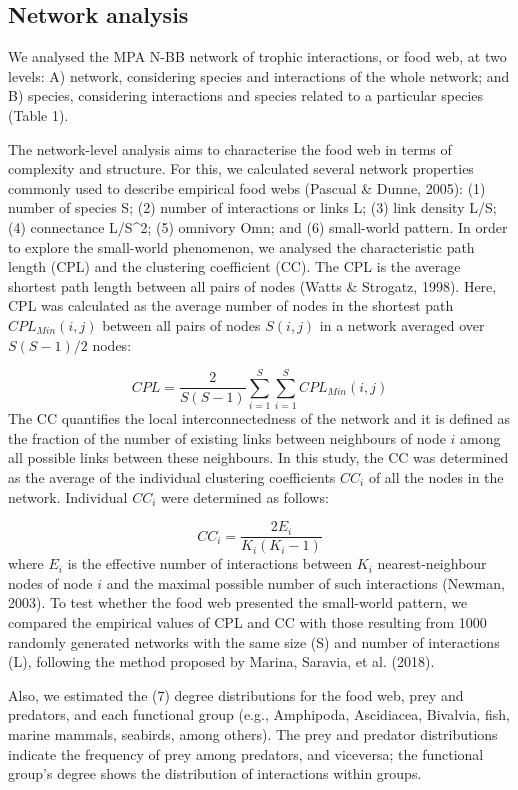 \documentclass[preprint, 3p,
authoryear]{elsarticle} %
\begin{document}
\hypertarget{network-analysis}{%
\subsection{Network analysis}\label{network-analysis}}

We analysed the MPA N-BB network of trophic interactions, or food web,
at two levels: A) network, considering species and interactions of the
whole network; and B) species, considering interactions and species
related to a particular species (Table 1).

The network-level analysis aims to characterise the food web in terms of
complexity and structure. For this, we calculated several network
properties commonly used to describe empirical food webs (Pascual \&
Dunne, 2005): (1) number of species S; (2) number of interactions or
links L; (3) link density L/S; (4) connectance L/S\^{}2; (5) omnivory
Omn; and (6) small-world pattern. In order to explore the small-world
phenomenon, we analysed the characteristic path length (CPL) and the
clustering coefficient (CC). The CPL is the average shortest path length
between all pairs of nodes (Watts \& Strogatz, 1998). Here, CPL was
calculated as the average number of nodes in the shortest path
\(CPL_{Min} (i,j)\) between all pairs of nodes \(S(i,j)\) in a network
averaged over \(S(S-1)/2\) nodes:

\[
CPL = \frac{2}{S(S-1)} \sum_{i = 1}^{S} \sum_{i = 1}^{S} {CPL_{Min}(i,j)}
\] The CC quantifies the local interconnectedness of the network and it
is defined as the fraction of the number of existing links between
neighbours of node \(i\) among all possible links between these
neighbours. In this study, the CC was determined as the average of the
individual clustering coefficients \(CC_i\) of all the nodes in the
network. Individual \(CC_i\) were determined as follows:

\[
CC_i = \frac{2E_i}{K_i(K_i-1)}
\] where \(E_i\) is the effective number of interactions between \(K_i\)
nearest-neighbour nodes of node \(i\) and the maximal possible number of
such interactions (Newman, 2003). To test whether the food web presented
the small-world pattern, we compared the empirical values of CPL and CC
with those resulting from 1000 randomly generated networks with the same
size (S) and number of interactions (L), following the method proposed
by Marina, Saravia, et al. (2018).

Also, we estimated the (7) degree distributions for the food web, prey
and predators, and each functional group (e.g., Amphipoda, Ascidiacea,
Bivalvia, fish, marine mammals, seabirds, among others). The prey and
predator distributions indicate the frequency of prey among predators,
and viceversa; the functional group's degree shows the distribution of
interactions within groups.
\end{document}
